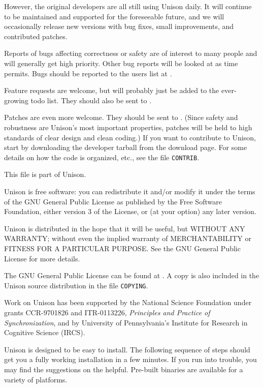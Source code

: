 \documentclass{article}
\begin{document}
However, the original developers are all still using Unison daily.  It
will continue to be maintained and supported for the foreseeable future,
and we will occasionally release new versions with bug fixes, small
improvements, and contributed patches.

Reports of bugs affecting correctness or safety are of interest to many
people and will generally get high priority.  Other bug reports will be
looked at as time permits.  Bugs should be reported to the users list at
\UNISONUSERS.

Feature requests are welcome, but will probably just be added to the
ever-growing todo list.  They should also be sent to \UNISONUSERS.

Patches are even more welcome.  They should be sent to
\UNISONHACKERS.
(Since safety and robustness are Unison's most important properties,
patches will be held to high standards of clear design and clean coding.)
If you want to contribute to Unison, start by downloading the developer
tarball from the download page.  For some details on how the code is
organized, etc., see the file {\tt CONTRIB}.


This file is part of Unison.

    Unison is free software: you can redistribute it and/or modify
    it under the terms of the GNU General Public License as published by
    the Free Software Foundation, either version 3 of the License, or
    (at your option) any later version.

    Unison is distributed in the hope that it will be useful,
    but WITHOUT ANY WARRANTY; without even the implied warranty of
    MERCHANTABILITY or FITNESS FOR A PARTICULAR PURPOSE.  See the
    GNU General Public License for more details.

    The GNU General Public License can be found at
    .  A copy is also included in the
    Unison source distribution in the file {\tt COPYING}.


Work on Unison has been supported by the National Science Foundation
under grants CCR-9701826 and ITR-0113226, {\em Principles and Practice of
  Synchronization}, and by University of Pennsylvania's Institute for
Research in Cognitive Science (IRCS).


Unison is designed to be easy to install.  The following sequence of
steps should get you a fully working installation in a few minutes.  If
you run into trouble, you may find the suggestions on the
 helpful.  Pre-built binaries are available for a
variety of platforms.
\end{document}
